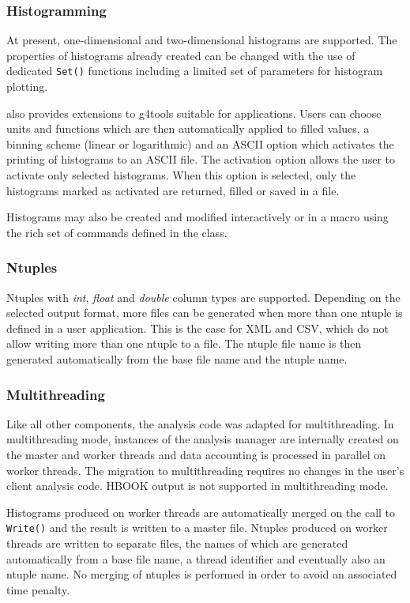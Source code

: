 \subsubsection{Histogramming}
At present, one-dimensional and two-dimensional histograms are supported.  The 
properties of histograms already created can be changed with the use of
dedicated \texttt{Set()} functions including a limited set of parameters for 
histogram plotting. 

 also provides extensions to g4tools suitable for 
\Gfour{} applications.  Users can choose units and functions which are then 
automatically applied to filled values, a binning scheme (linear or logarithmic)
and an ASCII option which activates the printing of histograms to an ASCII file.
The activation option allows the user to activate only selected histograms.  
When this option is selected, only the histograms marked as activated are 
returned, filled or saved in a file. 

Histograms may also be created and modified interactively or in a macro 
using the rich set of commands defined in the  class.

\subsubsection{Ntuples}
Ntuples with \emph{int}, \emph{float} and \emph{double} column types are 
supported.  Depending on the selected output format, more files can be 
generated when more than one ntuple is defined in a user application.  This is
the case for XML and CSV, which do not allow writing more than one ntuple to a
file.  The ntuple file name is then generated automatically from the base file
name and the ntuple name.

\subsubsection{Multithreading}
Like all other \Gfour{} components, the analysis code was adapted for 
multithreading.  In multithreading mode, instances of the analysis manager 
are internally created on the master and worker threads and data accounting is 
processed in parallel on worker threads.  The migration to multithreading 
requires no changes in the user's client analysis code.  HBOOK output is not 
supported in multithreading mode.

Histograms produced on worker threads are automatically merged on the call to 
\verb"Write()" and the result is written to a master file.  Ntuples produced on
worker threads are written to separate files, the names of which are generated 
automatically from a base file name, a thread identifier and eventually also an
ntuple name.  No merging of ntuples is performed in order to avoid an associated 
time penalty. 

